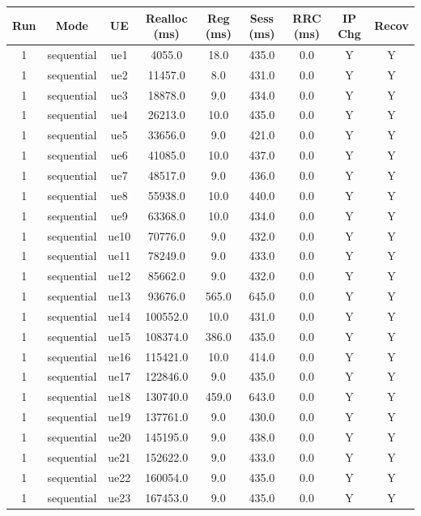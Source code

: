 \begin{table}[ht]
\centering
\begin{tabular}{|c|c|c|c|c|c|c|c|c|}
\hline
Run & Mode & UE & Realloc (ms) & Reg (ms) & Sess (ms) & RRC (ms) & IP Chg & Recov \\
\hline
1 & sequential & ue1 & 4055.0 & 18.0 & 435.0 & 0.0 & Y & Y \\
1 & sequential & ue2 & 11457.0 & 8.0 & 431.0 & 0.0 & Y & Y \\
1 & sequential & ue3 & 18878.0 & 9.0 & 434.0 & 0.0 & Y & Y \\
1 & sequential & ue4 & 26213.0 & 10.0 & 435.0 & 0.0 & Y & Y \\
1 & sequential & ue5 & 33656.0 & 9.0 & 421.0 & 0.0 & Y & Y \\
1 & sequential & ue6 & 41085.0 & 10.0 & 437.0 & 0.0 & Y & Y \\
1 & sequential & ue7 & 48517.0 & 9.0 & 436.0 & 0.0 & Y & Y \\
1 & sequential & ue8 & 55938.0 & 10.0 & 440.0 & 0.0 & Y & Y \\
1 & sequential & ue9 & 63368.0 & 10.0 & 434.0 & 0.0 & Y & Y \\
1 & sequential & ue10 & 70776.0 & 9.0 & 432.0 & 0.0 & Y & Y \\
1 & sequential & ue11 & 78249.0 & 9.0 & 433.0 & 0.0 & Y & Y \\
1 & sequential & ue12 & 85662.0 & 9.0 & 432.0 & 0.0 & Y & Y \\
1 & sequential & ue13 & 93676.0 & 565.0 & 645.0 & 0.0 & Y & Y \\
1 & sequential & ue14 & 100552.0 & 10.0 & 431.0 & 0.0 & Y & Y \\
1 & sequential & ue15 & 108374.0 & 386.0 & 435.0 & 0.0 & Y & Y \\
1 & sequential & ue16 & 115421.0 & 10.0 & 414.0 & 0.0 & Y & Y \\
1 & sequential & ue17 & 122846.0 & 9.0 & 435.0 & 0.0 & Y & Y \\
1 & sequential & ue18 & 130740.0 & 459.0 & 643.0 & 0.0 & Y & Y \\
1 & sequential & ue19 & 137761.0 & 9.0 & 430.0 & 0.0 & Y & Y \\
1 & sequential & ue20 & 145195.0 & 9.0 & 438.0 & 0.0 & Y & Y \\
1 & sequential & ue21 & 152622.0 & 9.0 & 433.0 & 0.0 & Y & Y \\
1 & sequential & ue22 & 160054.0 & 9.0 & 435.0 & 0.0 & Y & Y \\
1 & sequential & ue23 & 167453.0 & 9.0 & 435.0 & 0.0 & Y & Y \\

\end{tabular}
\end{table}
